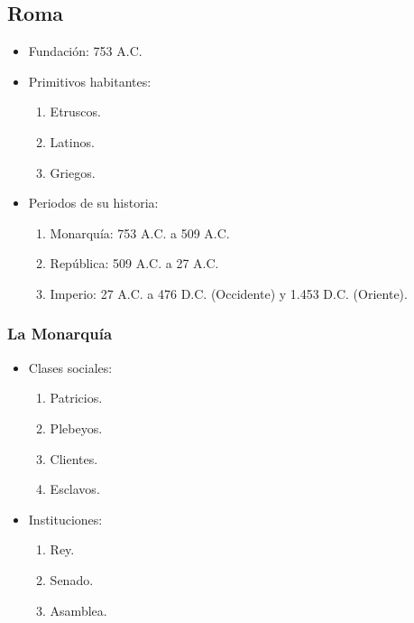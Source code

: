 \subsection{Roma}

\begin{itemize}

\item Fundación: 753 A.C.

\item Primitivos habitantes:
\begin{enumerate}
	\item Etruscos.
	\item Latinos.
	\item Griegos.
\end{enumerate}

\item Periodos de su historia:
\begin{enumerate}
	\item Monarquía: 753 A.C. a 509 A.C.
	\item República: 509 A.C. a 27 A.C.
	\item Imperio: 27 A.C. a 476 D.C. (Occidente) y 1.453 D.C. (Oriente).
\end{enumerate}

\end{itemize}

\subsubsection{La Monarquía}

\begin{itemize}

\item Clases sociales:
\begin{enumerate}
	\item Patricios.
	\item Plebeyos.
	\item Clientes.
	\item Esclavos.
\end{enumerate}

\item Instituciones:
\begin{enumerate}
	\item Rey.
	\item Senado.
	\item Asamblea.
\end{enumerate}

\end{itemize}

